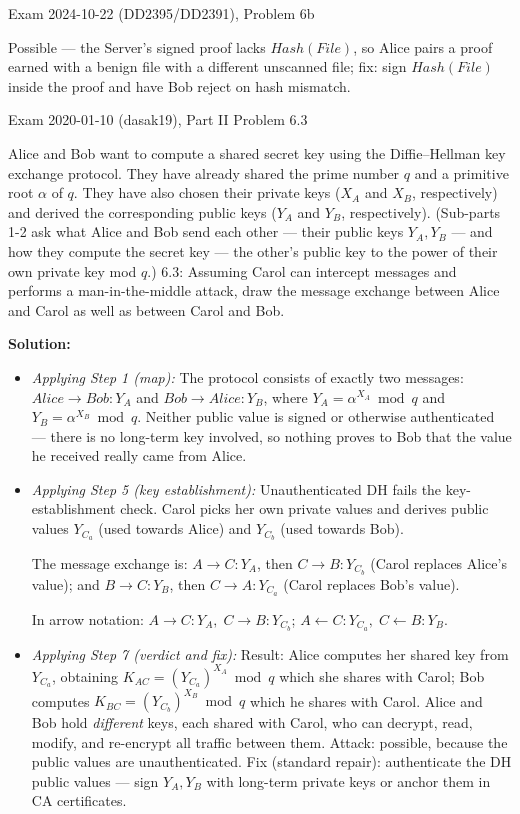 \documentclass[12pt, a4paper]{article}
\begin{document}
\begin{practicebox}{Exam 2024-10-22 (DD2395/DD2391), Problem 6b}
\begin{answerbox}
Possible --- the Server's signed proof lacks $Hash(File)$, so Alice pairs a proof earned with a benign file with a different unscanned file; fix: sign $Hash(File)$ inside the proof and have Bob reject on hash mismatch.
\end{answerbox}
\end{practicebox}

\begin{practicebox}{Exam 2020-01-10 (dasak19), Part II Problem 6.3}
\begin{problembox}
Alice and Bob want to compute a shared secret key using the Diffie--Hellman key exchange protocol. They have already shared the prime number $q$ and a primitive root $\alpha$ of $q$. They have also chosen their private keys ($X_A$ and $X_B$, respectively) and derived the corresponding public keys ($Y_A$ and $Y_B$, respectively). (Sub-parts 1-2 ask what Alice and Bob send each other --- their public keys $Y_A, Y_B$ --- and how they compute the secret key --- the other's public key to the power of their own private key mod $q$.) 6.3: Assuming Carol can intercept messages and performs a man-in-the-middle attack, draw the message exchange between Alice and Carol as well as between Carol and Bob.
\end{problembox}

\textbf{Solution:}
\begin{itemize}
    \item \textit{Applying Step 1 (map):} The protocol consists of exactly two messages: $Alice \to Bob : Y_A$ and $Bob \to Alice : Y_B$, where $Y_A = \alpha^{X_A} \bmod q$ and $Y_B = \alpha^{X_B} \bmod q$.
    Neither public value is signed or otherwise authenticated --- there is no long-term key involved, so nothing proves to Bob that the value he received really came from Alice.
    \item \textit{Applying Step 5 (key establishment):} Unauthenticated DH fails the key-establishment check. Carol picks her own private values and derives public values $Y_{C_a}$ (used towards Alice) and $Y_{C_b}$ (used towards Bob).

    The message exchange is: $A \to C : Y_A$, then $C \to B : Y_{C_b}$ (Carol replaces Alice's value); and $B \to C : Y_B$, then $C \to A : Y_{C_a}$ (Carol replaces Bob's value).

    In arrow notation: $A \to C : Y_A,\; C \to B : Y_{C_b}$; $A \leftarrow C : Y_{C_a},\; C \leftarrow B : Y_B$.
    \item \textit{Applying Step 7 (verdict and fix):} Result: Alice computes her shared key from $Y_{C_a}$, obtaining $K_{AC} = (Y_{C_a})^{X_A} \bmod q$ which she shares with Carol; Bob computes $K_{BC} = (Y_{C_b})^{X_B} \bmod q$ which he shares with Carol.
    Alice and Bob hold \emph{different} keys, each shared with Carol, who can decrypt, read, modify, and re-encrypt all traffic between them.
    Attack: possible, because the public values are unauthenticated. Fix (standard repair): authenticate the DH public values --- sign $Y_A, Y_B$ with long-term private keys or anchor them in CA certificates.
\end{itemize}


\end{practicebox}
\end{document}
